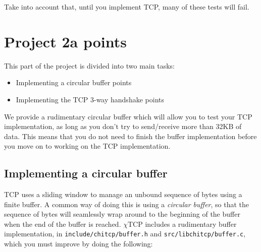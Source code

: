 \documentclass[10pt]{article}
\newcommand{\chitcp}{$\chi$\textsf{TCP} }
\newcommand{\points}[1]{{\sffamily\mdseries\guillemotleft #1 points\guillemotright{}}}
\begin{document}
Take into account that, until you implement TCP, many of these tests will fail.


\section{Project 2a \points{100}}
\label{sec:proj2a}

This part of the project is divided into two main tasks:

\begin{itemize}
 \item Implementing a circular buffer \points{60}
 \item Implementing the TCP 3-way handshake \points{40}
\end{itemize}

We provide a rudimentary circular buffer which will allow you to test your TCP implementation, as long as you don't try to send/receive more than 32KB of data. This means that you do not need to finish the buffer implementation before you move on to working on the TCP implementation.

\subsection*{Implementing a circular buffer}

TCP uses a sliding window to manage an unbound sequence of bytes using a finite buffer. A common way of doing this is using a \emph{circular buffer}, so that the sequence of bytes will seamlessly wrap around to the beginning of the buffer when the end of the buffer is reached. \chitcp includes a rudimentary buffer implementation, in \texttt{include/chitcp/buffer.h} and \texttt{src/libchitcp/buffer.c}, which you must improve by doing the following:
\end{document}

